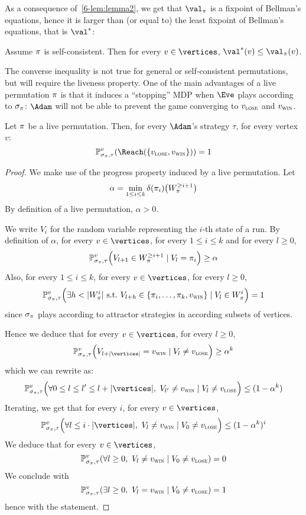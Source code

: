 As a consequence of~\cref{6-lem:lemma2}, we get that $\val_\perm$
is a fixpoint of Bellman's equations, hence it is larger than (or
equal to) the least fixpoint of Bellman's equations, that is $\val^*$:

\begin{corollary}
\label{6-cor:self-consistent_solution}
Assume $\pi$ is self-consistent.  Then for every $v \in
\vertices$, $\val^*(v) \le \val_\perm(v)$.
\end{corollary}

The converse inequality is not true for general or self-consistent
permutations, but will require the liveness property. One of the main
advantages of a live permutation $\pi$ is that it induces a
``stopping'' MDP when $\Eve$ plays according to $\sigma_\pi$: 
$\Adam$ will not be able to prevent the game converging to $v_{\textsc{lose}}$ and $v_{\textsc{win}}$.

\begin{lemma}
\label{6-lem:live_stopping}
Let $\pi$ be a live permutation. Then, for every $\Adam$'s strategy
$\tau$, for every vertex $v$:
\[
\probm^v_{\sigma_\perm,\tau} (\Reach(\{\vlose,\vwin\})) = 1
\]
\end{lemma}

\begin{proof}
We make use of the progress property induced by a live permutation.
Let
\[
\alpha = \min_{1 \le i \le k} \delta(\pi_i) \big(W_\pi^{\ge
i+1}\big)
\]
By definition of a live permutation, $\alpha>0$.

We write $V_i$ for the random variable representing the $i$-th state
of a run.
%
By definition of $\alpha$, for every $v \in \vertices$, for every $1
\le i \le k$ and for every $l \ge 0$,
\[
\mathbb{P}^v_{\sigma_\pi,\tau}\Big(V_{l+1} \in W_\pi^{\ge i+1} \mid
V_l = \pi_i\Big) \ge \alpha
\]
Also, for every $1 \le i \le k$, for every $v \in \vertices$, for
every $l \ge 0$,
\[
\mathbb{P}^v_{\sigma_\pi,\tau}\Big(\exists h < |W_\pi^i|\
\text{s.t.}\ V_{l+h} \in \{\pi_i,\ldots,\pi_k,v_{\textsc{win}}\} \mid V_l
\in W_\pi^i\Big)=1
\]
since $\sigma_\pi$ plays according to attractor strategies in
according subsets of vertices.

Hence we deduce that for every $v \in \vertices$, for every $l \ge
0$,
\[
\probm^v_{\sigma_\perm,\tau}\Big(V_{l+|\vertices|}=\vwin \mid V_l
\ne \vlose\Big) \ge \alpha^k
\]
which we can rewrite as:
\[
\probm^v_{\sigma_\perm,\tau}\Big(\forall 0 \le l \le l' \le
l+|\vertices|,\ V_{l'} \ne \vwin \mid V_l \ne \vlose\Big) \le
(1-\alpha^k)
\]
Iterating, we get that for every $i$, for every $v \in \vertices$,
\[
\probm^v_{\sigma_\perm,\tau}\Big(\forall l \le i \cdot |\vertices|,\
V_{l} \ne \vwin \mid V_0 \ne \vlose\Big) \le (1-\alpha^k)^i
\]
We  deduce that for every $v \in \vertices$,
\[
\probm^v_{\sigma_\perm,\tau}(\forall l \ge 0,\ V_l \ne \vwin \mid
V_0 \ne \vlose) = 0
\]
We conclude with
\[
\probm^v_{\sigma_\perm,\tau}(\exists l \ge 0,\ V_l = \vwin \mid V_0
\ne \vlose) = 1
\]
hence with the statement.
\end{proof}


